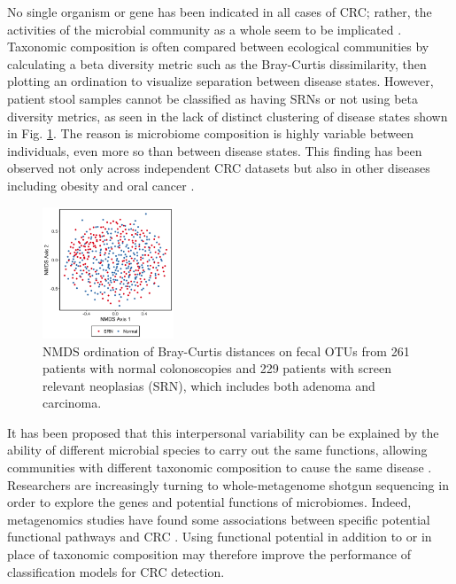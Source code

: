 \documentclass[11pt]{article}
\begin{document}
No single organism or gene has been indicated in all cases of CRC;
rather, the activities of the microbial community as a whole seem to be implicated \cite{louis_gut_2014}.
Taxonomic composition is often compared between ecological communities by calculating a beta diversity metric such as the Bray-Curtis dissimilarity, then plotting an ordination to visualize separation between disease states.
However, patient stool samples cannot be classified as having SRNs or not using beta diversity metrics,
as seen in the lack of distinct clustering of disease states shown in Fig. \ref{fig:nmds_otu}.
The reason is microbiome composition is highly variable between individuals, even more so than between disease states.
This finding has been observed not only across independent CRC datasets but also in other diseases including obesity and oral cancer \cite{weir_stool_2013, finucane_taxonomic_2014, perrera_inflammatory_2018}.
\begin{figure}
    \vspace{-20pt}
    \begin{center}
        \includegraphics[width=0.35\textwidth]{figures/topcuoglu_s1.png}
        \caption{NMDS ordination of Bray-Curtis distances on fecal OTUs from 261 patients with normal colonoscopies and 229 patients with screen relevant neoplasias (SRN), which includes both adenoma and carcinoma. \cite{topcuoglu_framework_2020}}
        \label{fig:nmds_otu}
    \end{center}
    \vspace{-20pt}
\end{figure}

It has been proposed that this interpersonal variability can be explained by the ability of different microbial species to carry out the same functions,
allowing communities with different taxonomic composition to cause the same disease \cite{franzosa_species-level_2018}.
Researchers are increasingly turning to whole-metagenome shotgun sequencing in order to explore the genes and potential functions of microbiomes.
Indeed, metagenomics studies have found some associations between specific potential functional pathways and CRC \cite{thomas_metagenomic_2019}.
Using functional potential in addition to or in place of taxonomic composition may therefore improve the performance of classification models for CRC detection.
\end{document}
